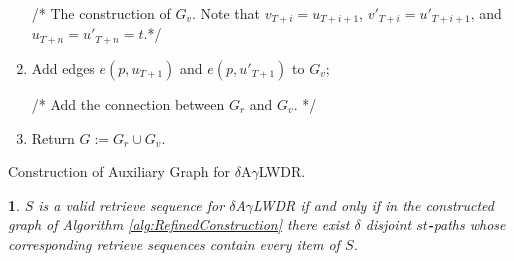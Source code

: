 \documentclass[11pt,english,onecolumn,draftcls]{IEEEtran}
\theoremstyle{plain}
\theoremstyle{plain}
\theoremstyle{plain}
\newtheorem{lem}[thm]{\protect\lemmaname}
\theoremstyle{plain}
\providecommand{\lemmaname}{Lemma}
\begin{document}
\begin{algorithm}
\begin{enumerate}
/{*} The construction of $G_{v}$. Note that $v_{T+i}=u_{T+i+1}$,
$v'_{T+i}=u'_{T+i+1}$, and $u_{T+n}=u'_{T+n}=t$.{*}/

\item Add edges $e(p,u_{T+1})$ and $e(p,u'_{T+1})$ to $G_{v}$;


/{*} Add the connection between $G_{r}$ and $G_{v}$. {*}/

\item Return $G:=G_{r}\cup G_{v}$.
\end{enumerate}
\protect\caption{\label{alg:RefinedConstruction}Construction of Auxiliary Graph for
$\delta$A$\gamma$LWDR. }
\end{algorithm}

\begin{lem}
\label{lem:refinedconst}$S$ is a valid retrieve sequence for $\delta$A$\gamma$LWDR
if and only if in the constructed graph of Algorithm \ref{alg:RefinedConstruction}
there exist $\delta$ disjoint \textbf{$st$-}paths whose corresponding
retrieve sequences contain every item of $S$.  \end{lem}
\end{document}
